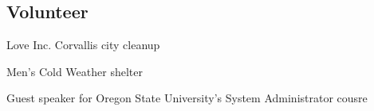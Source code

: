 \documentclass[margin,line]{resume}
\begin{document}
\begin{resume}
    \section{\mysidestyle Volunteer}
    \begin{list2}
    \item Love Inc. Corvallis city cleanup
    \item Men's Cold Weather shelter
    \item Guest speaker for Oregon State University's System Administrator cousre
    \end{list2}\vspace{-1.5mm}







\end{resume}
\end{document}
